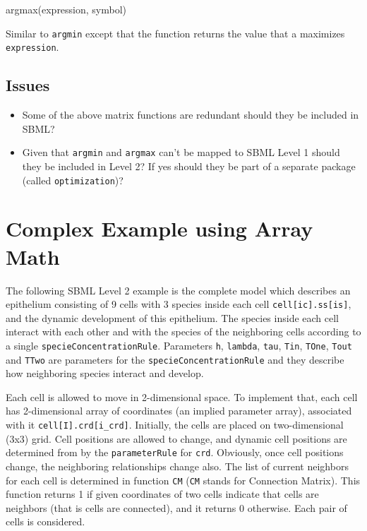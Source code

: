 \documentclass{cekarticle}
\begin{document}
\begin{example}
argmax(expression, symbol)
\end{example}

Similar to \texttt{argmin} except that the function returns the
value that a maximizes \texttt{expression}.

\subsection{Issues}
\begin{itemize}
\item Some of the above matrix functions are redundant should they be included in SBML?
\item Given that \texttt{argmin} and \texttt{argmax} can't be mapped to SBML Level 1
should they be included in Level 2?  If yes should they be part
of a separate package (called \texttt{optimization})?
\end{itemize}

\section{Complex Example using Array Math}

The following SBML Level 2 example is the complete model which
describes an epithelium consisting of 9 cells with 3 species
inside each cell \texttt{cell[ic].ss[is]}, and the dynamic
development of this epithelium. The species inside each cell
interact with each other and with the species of the neighboring
cells according to a single \texttt{specieConcentrationRule}.
Parameters \texttt{h}, \texttt{lambda}, \texttt{tau},
\texttt{Tin}, \texttt{TOne}, \texttt{Tout} and \texttt{TTwo} are
parameters for the \texttt{specieConcentrationRule} and they
describe how neighboring species interact and develop.

Each cell is allowed to move in 2-dimensional space. To implement
that, each cell has 2-dimensional array of coordinates (an
implied parameter array), associated with it
\verb+cell[I].crd[i_crd]+. Initially, the cells are placed on
two-dimensional (3x3) grid. Cell positions are allowed to change,
and dynamic cell positions are determined from by the
\texttt{parameterRule} for \texttt{crd}. Obviously, once cell
positions change, the neighboring relationships change also. The
list of current neighbors for each cell is determined in function
\texttt{CM} (\texttt{CM} stands for Connection Matrix). This
function returns 1 if given coordinates of two cells indicate
that cells are neighbors (that is cells are connected), and it
returns 0 otherwise. Each pair of cells is considered.
\end{document}
